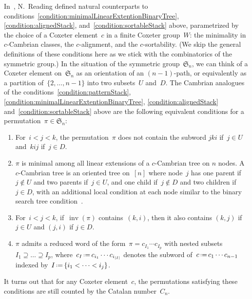 \documentclass[ALCO]{cedram}
\newcommand{\fS}{\mathfrak{S}}
\newcommand{\eqdef}{\mbox{\,\raisebox{0.2ex}{\scriptsize\ensuremath{\mathrm:}}\ensuremath{=}\,}}
\DeclareMathOperator{\inv}{inv}
\begin{document}
In~\cite{Reading-latticeCongruences, Reading-cambrianLattices, Reading-coxeterSortable}, N.~Reading defined natural counterparts to conditions~\ref{condition:minimalLinearExtentionBinaryTree}, \ref{condition:alignedStack}, and~\ref{condition:sortableStack} above, parametrized by the choice of a Coxeter element~$c$ in a finite Coxeter group~$W$: the minimality in $c$-Cambrian classes, the $c$-alignment, and the $c$-sortability.
(We skip the general definitions of these conditions here as we stick with the combinatorics of the symmetric group.)
In the situation of the symmetric group~$\fS_n$, we can think of a Coxeter element on~$\fS_n$ as an orientation of an $(n-1)$-path, or equivalently as a partition of~$\{2, \dots, n-1\}$ into two subsets~$U$ and~$D$.
The Cambrian analogues of the conditions~\ref{condition:patternStack}, \ref{condition:minimalLinearExtentionBinaryTree}, \ref{condition:alignedStack} and~\ref{condition:sortableStack} above are the following equivalent conditions for a permutation~$\pi \in \fS_n$:
\begin{enumerate}[(i')]
\addtocounter{enumi}{1}
\item \label{condition:patternCambrian}
For~$i < j < k$, the permutation~$\pi$ does not contain the subword $jki$ if~$j \in U$ and~$kij$ if~$j \in D$.
\item \label{condition:minimalLinearExtentionCambrian}
$\pi$ is minimal among all linear extensions of a $c$-Cambrian tree on $n$ nodes. A $c$-Cambrian tree is an oriented tree on~$[n]$ where node~$j$ has one parent if~$j \notin U$ and two parents if~$j \in U$, and one child if~$j \notin D$ and two children if~$j \in D$, with an additional local condition at each node similar to the binary search tree condition~\cite{ChatelPilaud}.
\item \label{condition:alignedCambrian}
For~$i < j < k$, if~$\inv(\pi)$ contains~$(k,i)$, then it also contains $(k,j)$ if~$j \in U$ and $(j,i)$ if $j \in D$.
\item \label{condition:sortableCambrian}
$\pi$ admits a reduced word of the form~$\pi = c_{I_1} \cdots c_{I_p}$ with nested subsets ${I_1 \supseteq \dots \supseteq I_p}$, where~$c_I \eqdef c_{i_1} \cdots c_{i_{|I|}}$ denotes the subword of~$c \eqdef c_1 \cdots c_{n-1}$ indexed by~$I \eqdef \{i_1 < \dots < i_j\}$.
\end{enumerate}
It turns out that for any Coxeter element~$c$, the permutations satisfying these conditions are still counted by the Catalan number~$C_n$.
\end{document}

